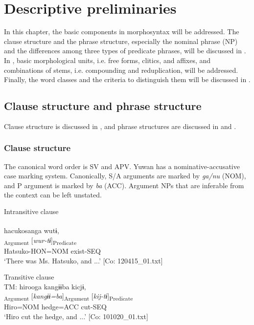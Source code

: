 \chapter{Descriptive preliminaries}\label{chap:4}

In this chapter, the basic components in morphosyntax will be addressed. The clause structure and the phrase structure, especially the nominal phrase (NP) and the differences among three types of predicate phrases, will be discussed in . In , basic morphological units, i.e. free forms, clitics, and affixes, and combinations of stems, i.e. compounding and reduplication, will be addressed. Finally, the word classes and the criteria to distinguish them will be discussed in .

\section{Clause structure and phrase structure}\label{sec:4.1}

Clause structure is discussed in , and phrase structures are discussed in  and .

\subsection{Clause structure}\label{sec:4.1.1}

The canonical word order is SV and APV. Yuwan has a nominative-accusative case marking system. Canonically, S/A arguments are marked by \textit{ga/nu} (NOM), and P argument is marked by \textit{ba} (ACC). Argument NPs that are inferable from the context can be left unstated.

\ea\label{ex:4.1}
\ea  Intransitive clause\\\label{ex:4.1a}\\
    \glll    hacukosanga  wutɨ,\\
      [\textit{hacuko-san=ga}]\textsubscript{Argument}  [\textit{wur-tɨ}]\textsubscript{Predicate}\\
      Hatsuko-HON=NOM  exist-SEQ\\
      \glt       ‘There was Ms. Hatsuko, and ...’ [Co: 120415\_01.txt]

\ex Transitive clause\\\label{ex:4.1b}
\glll    TM:  hirooga  kangɨɨba  kicjɨ,\\
      [\textit{hiroo=ga}]\textsubscript{Argument}  [\textit{kangɨɨ=ba}]\textsubscript{Argument}  [\textit{kij-tɨ}]\textsubscript{Predicate}\\
      Hiro=NOM  hedge=ACC  cut-SEQ\\
      \glt       ‘Hiro cut the hedge, and ...’ [Co: 101020\_01.txt]
    \z
\z

